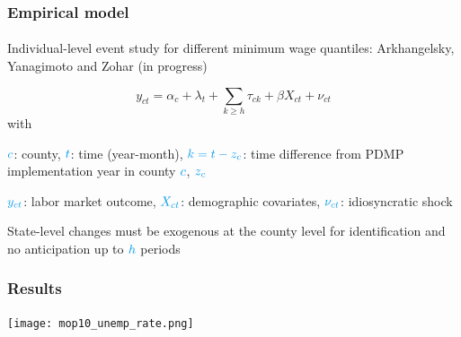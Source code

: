 
\begin{frame}

    \frametitle{Empirical model} %
    \framesubtitle{}  %
    \rmfamily %
    
    \begin{wideitemize}
        \item Individual-level event study for different minimum wage quantiles: \textcolor{fgre}{Arkhangelsky, Yanagimoto and Zohar (in progress)}
    \end{wideitemize}
    
    \begin{equation*}
        y_{ct} = \alpha_c + \lambda_t + \sum_{k\geq h}\tau_{ck} + \beta X_{ct} + \nu_{ct}
    \end{equation*}
    with 
    \vspace{9pt}
    \begin{wideitemize}
        \item[\textcolor{fblu}{\textbullet}] \(\textcolor{fblu}{c}\): county, \(\textcolor{fblu}{t}\): time (year-month), \(\textcolor{fblu}{k = t - z_c}\): time difference from PDMP implementation year in county \(\textcolor{fblu}{c}\), \(\textcolor{fblu}{z_c}\)
        \item[\textcolor{fblu}{\textbullet}] \(\textcolor{fblu}{y_{ct}}\): labor market outcome, \(\textcolor{fblu}{X_{ct}}\): demographic covariates, \(\textcolor{fblu}{\nu_{ct}}\): idiosyncratic shock 
    \end{wideitemize}
    \vspace{9pt}
    State-level changes must be exogenous at the county level for \textcolor{fblu}{identification} and no anticipation up to \(\textcolor{fblu}{h}\) periods
    
\end{frame}

\begin{frame}

    \label{unemp_rate_result}
    \frametitle{Results} %
    \framesubtitle{}  %
    \rmfamily %
    
    \begin{center}
        \texttt{[image: mop10\_unemp\_rate.png]}
    \end{center}

    \hyperlink{perc_comparison_1}{}
    \hyperlink{ta_1}{}

\end{frame}


